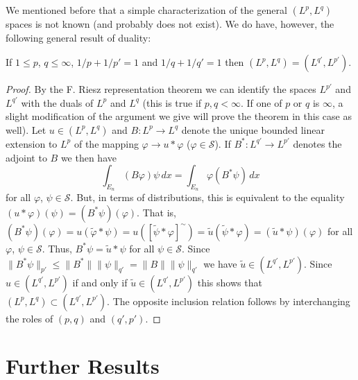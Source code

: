 We mentioned before that a simple characterization of the general
$(L^{p}, L^{q})$ spaces is not known (and probably does not exist). We do
have, however, the following general result of duality:

\begin{theorem}\label{thm:c1-3-20}
If $1 \leq p$, $q \leq \infty$, $1/p + 1/p' = 1$ and $1/q + 1/q' = 1$ then
$(L^{p}, L^{q}) = (L^{q'}, L^{p'})$.
\end{theorem}

\begin{proof}
By the F. Riesz representation theorem we can identify the spaces $L^{p'}$ and
$L^{q'}$ with the duals of $L^{p}$ and $L^{q}$ (this is true if $p, q < \infty$.
If one of $p$ or $q$ is $\infty$, a slight modification of the argument we
give will prove the theorem in this case as well). Let $u \in (L^{p}, L^{q})$
and $B\colon L^{p} \to L^{q}$ denote the unique bounded linear extension to
$L^{p}$ of the mapping $\varphi \to u * \varphi$
($\varphi \in \mathscr{S}$). If $B^{*}\colon L^{q'} \to L^{p'}$ denotes the
adjoint to $B$ we then have
\[
\int_{E_{n}}(B\varphi)\psi\,dx=\int_{E_{n}}\varphi(B^{*}\psi)\,dx
\]
for all $\varphi$, $\psi \in \mathscr{S}$. But, in terms of distributions,
this is equivalent to the equality $(u * \varphi)(\psi) = (B^{*}\psi)(\varphi)$.
That is,
$(B^{*}\psi)(\varphi) = u(\tilde{\varphi} * \psi) = u([\tilde{\psi} * \varphi]^{\sim}) = \tilde{u}(\tilde{\psi} * \varphi) = (\tilde{u} * \psi)(\varphi)$
for all $\varphi$, $\psi \in \mathscr{S}$. Thus, $B^{*}\psi = \tilde{u} * \psi$
for all $\psi \in \mathscr{S}$. Since
$\|B^{*}\psi\|_{p'} \leq \|B^{*}\|\|\psi\|_{q'} = \|B\|\|\psi\|_{q'}$ we have
$\tilde{u} \in (L^{q'}, L^{p'})$. Since $u \in (L^{q'}, L^{p'})$ if and only if
$\tilde{u} \in (L^{q'}, L^{p'})$ this shows that
$(L^{p}, L^{q}) \subset (L^{q'}, L^{p'})$. The opposite inclusion relation
follows by interchanging the roles of $(p, q)$ and $(q', p')$.
\end{proof}

\section{Further Results}

